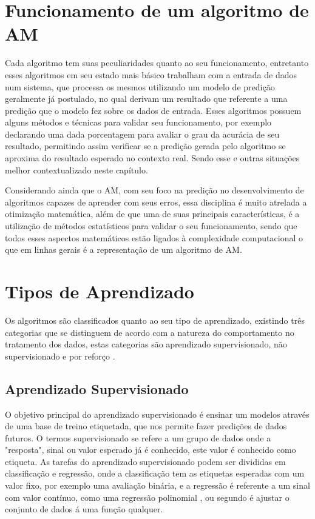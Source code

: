 \section{Funcionamento de um algoritmo de AM}
Cada algoritmo tem suas peculiaridades quanto ao seu funcionamento, entretanto esses algoritmos em seu estado mais básico trabalham com a entrada de dados num sistema, que processa os mesmos utilizando um modelo de predição geralmente já postulado, no qual derivam um resultado que referente a uma predição que o modelo fez sobre os dados de entrada. Esses algoritmos possuem alguns métodos e técnicas para validar seu funcionamento, por exemplo declarando uma dada porcentagem para avaliar o grau da acurácia de seu resultado, permitindo assim verificar se a predição gerada pelo algoritmo se aproxima do resultado esperado no contexto real. Sendo esse e outras situações melhor contextualizado neste capítulo.

Considerando ainda que o AM, com seu foco na predição no desenvolvimento de algoritmos capazes de aprender com seus erros, essa disciplina é muito atrelada a otimização matemática, além de que uma de suas principais características, é a utilização de métodos estatísticos para validar o seu funcionamento, sendo que todos esses aspectos matemáticos estão ligados à complexidade computacional o que em linhas gerais é a representação de um algoritmo de AM.

\section{Tipos de Aprendizado}
Os algoritmos são classificados quanto ao seu tipo de aprendizado, existindo três categorias que se distinguem de acordo com a natureza do comportamento no tratamento dos dados, estas categorias são aprendizado supervisionado, não supervisionado e por reforço \cite{geron2017hands}.
 
\subsection{Aprendizado Supervisionado}
O objetivo principal do aprendizado supervisionado é ensinar um modelos através de uma base de treino etiquetada, que nos permite fazer predições de dados futuros. O termos supervisionado se refere a um grupo de dados onde a "resposta", sinal ou valor esperado já é conhecido, este valor é conhecido como etiqueta. As tarefas do aprendizado supervisionado podem ser divididas em classificação e regressão, onde a classificação tem as etiquetas esperadas com um valor fixo, por exemplo uma avaliação binária, e a regressão é referente a um sinal com valor contínuo, como uma regressão polinomial \cite{geron2017hands}, ou segundo \cite{kirk2014thoughtful} é ajustar o conjunto de dados á uma função qualquer.


